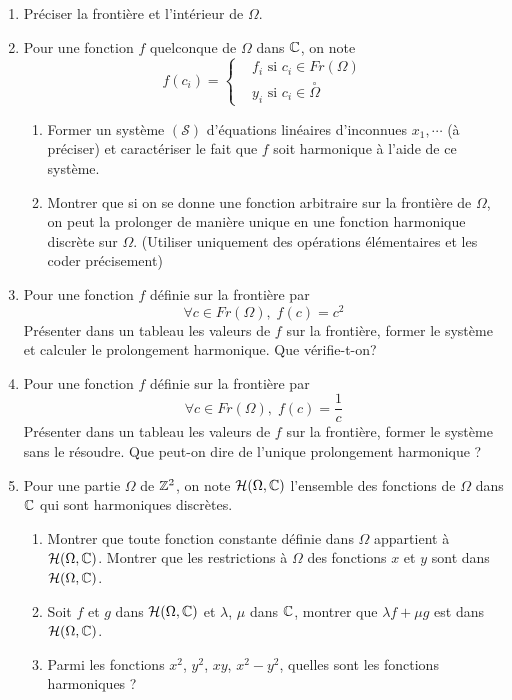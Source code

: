 \begin{enumerate}
  \item Préciser la frontière et l'intérieur de $\Omega$.
  \item Pour une fonction $f$ quelconque de $\Omega$ dans $\mathbb{C}$, on note
  \begin{displaymath}
f(c_i)=    \left\lbrace 
    \begin{aligned}
      &f_i \text{ si } c_i \in Fr(\Omega)\\
      &y_i \text{ si } c_i \in \overset{\circ}{\Omega}
    \end{aligned}
\right. 
  \end{displaymath}
\begin{enumerate}
  \item Former un système $(\mathcal{S})$ d'équations linéaires d'inconnues $x_1,\cdots$ (à préciser) et caractériser le fait que $f$ soit harmonique à l'aide de ce système.
  \item Montrer que si on se donne une fonction arbitraire sur la frontière de $\Omega$, on peut la prolonger de manière unique en une fonction harmonique discrète sur $\Omega$. (Utiliser uniquement des opérations élémentaires et les coder précisement)
\end{enumerate}
\item Pour une fonction $f$ définie sur la frontière par 
\begin{displaymath}
  \forall c\in Fr(\Omega),\; f(c) = c^2
\end{displaymath}
Présenter dans un tableau les valeurs de $f$ sur la frontière, former le système et calculer le prolongement harmonique. Que vérifie-t-on?
\item Pour une fonction $f$ définie sur la frontière par 
\begin{displaymath}
  \forall c\in Fr(\Omega),\; f(c) = \frac{1}{c}
\end{displaymath}
Présenter dans un tableau les valeurs de $f$ sur la frontière, former le système sans le résoudre. Que peut-on dire de l'unique prolongement harmonique ?

\item Pour une partie $\Omega$ de $\mathbb{Z}^2$, on note $\mathcal{H}(\Omega,\mathbb{C})$ l'ensemble des fonctions de $\Omega$ dans $\mathbb{C}$ qui sont harmoniques discrètes.
\begin{enumerate}
  \item Montrer que toute fonction constante définie dans $\Omega$ appartient à $\mathcal{H}(\Omega,\mathbb{C})$. Montrer que les restrictions à $\Omega$ des fonctions $x$ et $y$ sont dans $\mathcal{H}(\Omega,\mathbb{C})$.
  \item Soit $f$ et $g$ dans $\mathcal{H}(\Omega,\mathbb{C})$ et $\lambda$, $\mu$ dans $\mathbb{C}$, montrer que $\lambda f + \mu g$ est dans $\mathcal{H}(\Omega,\mathbb{C})$.
  \item Parmi les fonctions $x^2$, $y^2$, $xy$, $x^2 - y^2$, quelles sont les fonctions harmoniques ?
\end{enumerate}
\end{enumerate}
